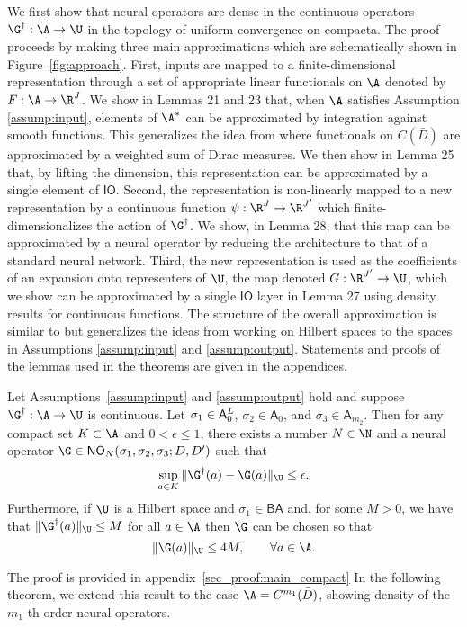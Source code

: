 We first show that neural operators are dense in the continuous operators \(\G^\dagger : \A \to \U\) in the topology of uniform convergence on compacta. The proof proceeds by making three main approximations which are schematically shown in Figure~\ref{fig:approach}. First, inputs are mapped to a finite-dimensional representation through a set of appropriate linear functionals on \(\A\) denoted by \(F : \A \to \R^{J}\). We show in Lemmas 21 and 23 that, when \(\A\) satisfies Assumption \ref{assump:input}, elements of \(\A^*\) can be approximated by integration against smooth functions. This generalizes the idea from \citep{chen1995universal} where functionals on \(C(\bar{D})\) are approximated by a weighted sum of Dirac measures. We then show in Lemma 25 that, by lifting the dimension, this representation can be approximated by a single element of \(\mathsf{IO}\). Second, the representation is non-linearly mapped to a new representation by a continuous function \(\psi : \R^{J} \to \R^{J'}\) which finite-dimensionalizes the action of \(\G^\dagger\). We show, in Lemma 28, that this map can be approximated by a neural operator by reducing the architecture to that of a standard neural network. Third, the new representation is used as the coefficients of an expansion onto representers of \(\U\), the map denoted \(G : \R^{J'} \to \U\), which we show can be approximated by a single \(\mathsf{IO}\) layer in Lemma 27 using density results for continuous functions. The structure of the overall approximation is similar to \citep{Kovachki} but generalizes the ideas from working on Hilbert spaces to the spaces in Assumptions \ref{assump:input} and \ref{assump:output}. Statements and proofs of the lemmas used in the theorems are given in the appendices.

\begin{theorem}
\label{thm:main_compact}
Let Assumptions~\ref{assump:input} and \ref{assump:output} hold and suppose \(\G^\dagger : \A \to \U\) is continuous.
Let \(\sigma_1 \in \mathsf{A}^{\emph{\text{L}}}_0\), \(\sigma_2 \in \mathsf{A}_0\), and \(\sigma_3 \in \mathsf{A}_{m_2}\).
Then for any compact set \(K \subset \A\) and \(0 < \epsilon \leq 1\), there exists a number \(N \in \N\) and a neural operator 
\(\G \in \mathsf{NO}_{N}(\sigma_1,\sigma_2,\sigma_3;D,D')\) such that
\[\sup_{a \in K} \|\G^\dagger (a) - \G (a) \|_{\U} \leq \epsilon.\]
Furthermore, if \(\U\) is a Hilbert space and \(\sigma_1 \in \mathsf{BA}\) and, for some \(M > 0\), we have that \(\|\G^\dagger (a)\|_{\U} \leq M\) for all 
\(a \in \A\) then \(\G\) can be chosen so that
\[\|\G(a)\|_{\U} \leq 4M, \qquad \forall a \in \A.\]
\end{theorem}
The proof is provided in appendix~\ref{sec_proof:main_compact}
In the following theorem, we extend this result to the case \(\A = C^{m_1}(\bar{D})\), showing density of the \(m_1\)-th order neural operators.

